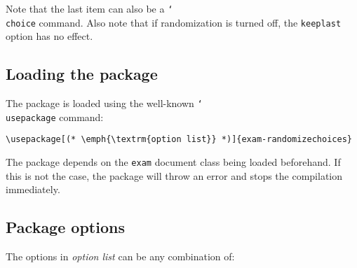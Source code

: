 \documentclass[12pt,a4paper]{exam}
\providecommand{\texorpdfstring}[2]{#1}
\newcommand{\bs}{\texorpdfstring{\char`\\}{}}
\begin{document}
Note that the last item can also be a \texttt{\bs choice} command. Also note
that if randomization is turned off, the \texttt{keeplast} option has no effect.

\subsection{Loading the package}
The package is loaded using the well-known \texttt{\bs{usepackage}} command:

\begin{lstlisting}
\usepackage[(* \emph{\textrm{option list}} *)]{exam-randomizechoices}
\end{lstlisting}

The package depends on the \texttt{exam} document class being loaded beforehand. If this
is not the case, the package will throw an error and stops the compilation
immediately.


\subsection{Package options}

The options in \emph{\textrm{option list}} can be any combination of:
\end{document}
